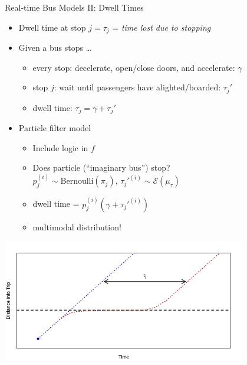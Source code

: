 \documentclass[10pt,t]{beamer}
\begin{document}
\begin{frame}{Real-time Bus Models II: Dwell Times}
  \onslide<+->
  \begin{itemize}[<+->]
    \item Dwell time at stop $j = \tau_j$ = \emph{time lost due to stopping}
    \item Given a bus stops \ldots
      
      \begin{itemize}[<1->]
      \item every stop: decelerate, open/close doors, and accelerate: $\gamma$
      \item stop $j$: wait until passengers have alighted/boarded: $\tau_j'$
      \item dwell time: $\tau_j = \gamma + \tau_j'$
      \end{itemize}

    \item Particle filter model
      \begin{itemize}
        \item Include logic in $f$
        \item Does particle (``imaginary bus'') stop?\\
          $p_j^{(i)} \sim \text{Bernoulli}(\pi_j)$, $\tau_j'^{(i)} \sim \mathcal{E}(\mu_\tau)$
        \item dwell time =  $p_j^{(i)} (\gamma + \tau_j'^{(i)})$
        \item multimodal distribution!
      \end{itemize}
    \end{itemize}

  \vspace{-6em}
  \begin{overprint}
    \centering
    \includegraphics[width=0.8\textwidth]{figs/dwell_time.png}
  \end{overprint}
\end{frame}
\end{document}
